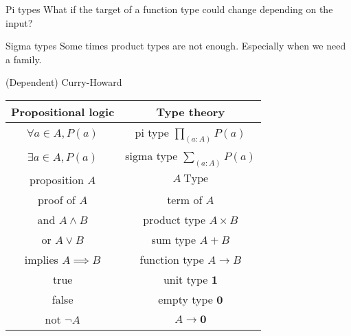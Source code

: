\documentclass[usenames,dvipsnames]{beamer}
\begin{document}
    \begin{frame}{Pi types}
        What if the target of a function type could change depending on the input?
    \end{frame}
    
    \begin{frame}{Sigma types}
        Some times product types are not enough. Especially when we need a family.
    \end{frame}
    
    \begin{frame}{(Dependent) Curry-Howard}
        \begin{table}
            \begin{tabular}{c || c}
                \textbf{Propositional logic} & \textbf{Type theory} \\
                \hline\hline
                $\forall a \in A, P(a)$ & pi type $\prod_{(a : A)}P(a)$     \\
                $\exists a \in A, P(a)$ & sigma type $\sum_{(a:A)}P(a)$     \\
                proposition $A$         & $A\ \text{Type}$                  \\
                proof of $A$            & term of $A$                       \\
                and $A \land B$         & product type $A \times B$         \\
                or $A \lor B$           & sum type $A + B$                  \\
                implies $A \implies B$  & function type $A \to B$           \\
                true                    & unit type $\mathbf{1}$            \\
                false                   & empty type $\mathbf{0}$           \\
                not $¬A$                & $A \to \mathbf{0}$                \\
            \end{tabular}
        \end{table}
    \end{frame}
    
\end{document}

